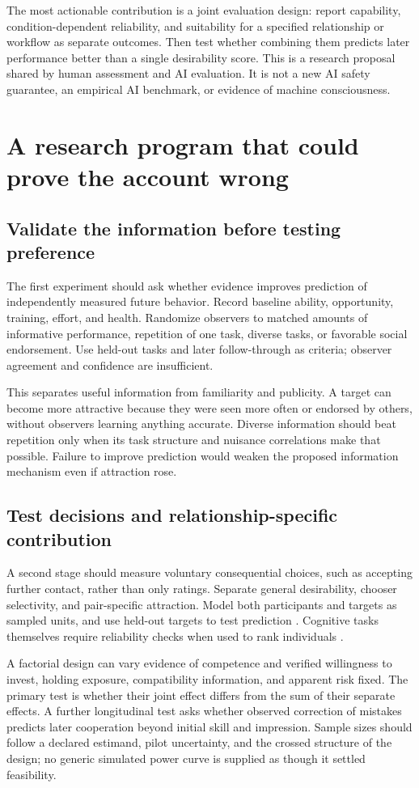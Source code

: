 \documentclass[10pt,twocolumn,letterpaper]{article}
\begin{document}
The most actionable contribution is a joint evaluation design: report capability, condition-dependent reliability, and suitability for a specified relationship or workflow as separate outcomes. Then test whether combining them predicts later performance better than a single desirability score. This is a research proposal shared by human assessment and AI evaluation. It is not a new AI safety guarantee, an empirical AI benchmark, or evidence of machine consciousness.

\section{A research program that could prove the account wrong}
\subsection{Validate the information before testing preference}
The first experiment should ask whether evidence improves prediction of independently measured future behavior. Record baseline ability, opportunity, training, effort, and health. Randomize observers to matched amounts of informative performance, repetition of one task, diverse tasks, or favorable social endorsement. Use held-out tasks and later follow-through as criteria; observer agreement and confidence are insufficient.

This separates useful information from familiarity and publicity. A target can become more attractive because they were seen more often or endorsed by others, without observers learning anything accurate. Diverse information should beat repetition only when its task structure and nuisance correlations make that possible. Failure to improve prediction would weaken the proposed information mechanism even if attraction rose.

\subsection{Test decisions and relationship-specific contribution}
A second stage should measure voluntary consequential choices, such as accepting further contact, rather than only ratings. Separate general desirability, chooser selectivity, and pair-specific attraction. Model both participants and targets as sampled units, and use held-out targets to test prediction \citep{judd}. Cognitive tasks themselves require reliability checks when used to rank individuals \citep{hedge}.

A factorial design can vary evidence of competence and verified willingness to invest, holding exposure, compatibility information, and apparent risk fixed. The primary test is whether their joint effect differs from the sum of their separate effects. A further longitudinal test asks whether observed correction of mistakes predicts later cooperation beyond initial skill and impression. Sample sizes should follow a declared estimand, pilot uncertainty, and the crossed structure of the design; no generic simulated power curve is supplied as though it settled feasibility.
\end{document}
